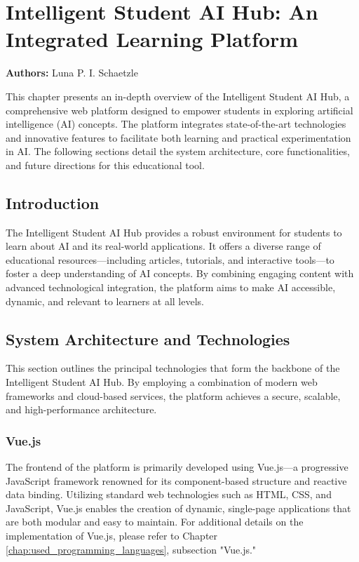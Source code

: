 \chapter{Intelligent Student AI Hub: An Integrated Learning Platform} 
\label{chap:Student_AI_Hub}
\textbf{Authors:} Luna P. I. Schaetzle

This chapter presents an in-depth overview of the Intelligent Student AI Hub, 
a comprehensive web platform designed to empower students in exploring artificial intelligence (AI) concepts. 
The platform integrates state-of-the-art technologies and innovative features to facilitate both learning and practical experimentation in AI. 
The following sections detail the system architecture, core functionalities, and future directions for this educational tool.

\section{Introduction}

The Intelligent Student AI Hub provides a robust environment for students to learn about AI and its real-world applications. 
It offers a diverse range of educational resources—including articles, tutorials, and interactive tools—to foster a deep understanding of AI concepts. 
By combining engaging content with advanced technological integration, the platform aims to make AI accessible, dynamic, and relevant to learners at all levels.

\section{System Architecture and Technologies}

This section outlines the principal technologies that form the backbone of the Intelligent Student AI Hub. By employing a combination of modern web frameworks and cloud-based services, the platform achieves a secure, scalable, and high-performance architecture.

\subsection{Vue.js}

The frontend of the platform is primarily developed using Vue.js—a progressive JavaScript framework renowned for its component-based structure and reactive data binding. Utilizing standard web technologies such as HTML, CSS, and JavaScript, Vue.js enables the creation of dynamic, single-page applications that are both modular and easy to maintain. For additional details on the implementation of Vue.js, please refer to Chapter \ref{chap:used_programming_languages}, subsection "Vue.js."

